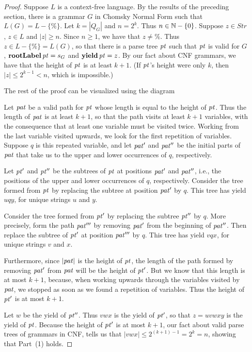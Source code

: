 \begin{proof}
Suppose $L$ is a context-free language.  By the results of the
preceding section, there is a grammar $G$ in Chomsky Normal Form such
that $L(G)=L-\{\%\}$.  Let $k=|Q_G|$ and $n= 2^k$.  Thus
$n\in\mathbb{N}-\{0\}$. Suppose $z\in Str$, $z\in L$ and $|z|\geq n$.
Since $n\geq 1$, we have that $z\neq\%$.  Thus $z\in L-\{\%\}=L(G)$,
so that there is a parse tree ${\it pt}$ such that ${\it pt}$ is valid for $G$,
$\mathbf{rootLabel}\,{\it pt}=s_G$ and $\mathbf{yield}\,{\it pt}=z$.  By our fact about CNF
grammars, we have that the height of ${\it pt}$ is at least $k+1$.  (If
${\it pt}$'s height were only $k$, then $|z|\leq 2^{k-1}<n$, which is
impossible.)

The rest of the proof can be visualized using the
diagram
\begin{center}

\end{center}

Let ${\it pat}$ be a valid path for ${\it pt}$ whose length is equal to the
height of ${\it pt}$.  Thus the length of ${\it pat}$ is at least $k+1$, so that
the path visits at least $k+1$ variables, with the consequence that at
least one variable must be visited twice.  Working from the last
variable visited upwards, we look for the first repetition of
variables.  Suppose $q$ is this repeated variable, and let ${\it pat}'$
and ${\it pat}''$ be the initial parts of ${\it pat}$ that take us
to the upper and lower occurrences of $q$, respectively.

Let ${\it pt}'$ and ${\it pt}''$ be the subtrees of ${\it pt}$ at positions
${\it pat}'$ and ${\it pat}''$, i.e., the positions of the upper and lower
occurrences of $q$, respectively.
Consider the tree formed from ${\it pt}$ by replacing the subtree
at position ${\it pat}'$ by $q$.  This tree has yield
$uqy$, for unique strings $u$ and $y$.

Consider the tree formed from ${\it pt}'$ by replacing the subtree
${\it pt}''$ by $q$.  More precisely, form the path ${\it pat}'''$ 
by removing ${\it pat}'$ from the beginning of ${\it pat}''$.
Then replace the subtree of ${\it pt}'$ at position ${\it pat}'''$ by
$q$.  This tree has yield $vqx$, for unique strings $v$ and $x$.

Furthermore, since $|{\it pat}|$ is the height of ${\it pt}$, the
length of the path formed by removing ${\it pat}'$ from ${\it pat}$ will be the
height of ${\it pt}'$.  But we know that this length is at most $k+1$,
because, when working upwards through the variables visited by ${\it pat}$,
we stopped as soon as we found a repetition of variables.  Thus the
height of ${\it pt}'$ is at most $k+1$.

Let $w$ be the yield of ${\it pt}''$.  Thus $vwx$ is the yield of ${\it pt}'$,
so that $z=uvwxy$ is the yield of ${\it pt}$.  Because the height of ${\it pt}'$
is at most $k+1$, our fact about valid parse trees of grammars in CNF,
tells us that $|vwx|\leq 2^{(k+1)-1} = 2^k=n$, showing that Part~(1)
holds.


\end{proof}
